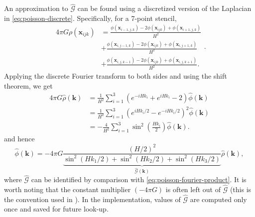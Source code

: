 An approximation to $\hat{\mathcal{G}}$ can be found using a discretized version of the Laplacian in \autoref{eq:poisson-discrete}.
Specifically, for a 7-point stencil,
\begin{equation*}
    \begin{split}
        4\pi G\rho(\mathbf{x}_{ijk})
         & =\frac{\phi(\mathbf{x}_{i-1,j,k}) - 2\phi(\mathbf{x}_{ijk})+\phi(\mathbf{x}_{i+1,j,k})}{H^2}   \\
         & + \frac{\phi(\mathbf{x}_{i,j-1,k}) - 2\phi(\mathbf{x}_{ijk})+\phi(\mathbf{x}_{i,j+1,k})}{H^2}  \\
         & + \frac{\phi(\mathbf{x}_{i,j,k-1}) - 2\phi(\mathbf{x}_{ijk})+\phi(\mathbf{x}_{i,j,k+1})}{H^2}.
    \end{split}.
\end{equation*}
Applying the discrete Fourier transform to both sides and using the shift theorem, we get
\begin{align*}
    4\pi G \hat{\rho}(\mathbf{k})
     & = \frac{1}{H^2}\sum_{i=1}^{3}\left( e^{-iHk_i} + e^{iHk_i}-2 \right)\hat{\phi}(\mathbf{k})       \\
     & = \frac{1}{H^2} \sum_{i=1}^{3}\left( e^{iHk_i/2} - e^{-iHk_i/2} \right)^2 \hat{\phi}(\mathbf{k}) \\
     & = -\frac{4}{H^2}\sum_{i=1}^{3}\sin^2\left(\frac{Hk_i}{2}\right)\hat{\phi}(\mathbf{k}).
\end{align*}
and hence
\begin{equation}\label{eq:dft-transformed-phi}
    \hat{\phi}(\mathbf{k}) = -4\pi G\underbrace{\frac{(H/2)^2}{\sin^2(Hk_1/2) + \sin^2(Hk_2/2) + \sin^2 (Hk_3/2)}}_{\hat{\mathcal{G}}(\mathbf{k})} \hat{\rho}(\mathbf{k}),
\end{equation}
where $\hat{\mathcal{G}}$ can be identified by comparison with \autoref{eq:poisson-fourier-product}.
It is worth noting that the constant multiplier $(-4\pi G)$ is often left out of $\hat{\mathcal{G}}$ (this is the convention used in \cite{Hockney1988}).
In the implementation, values of $\hat{\mathcal{G}}$ are computed only once and saved for future look-up.

